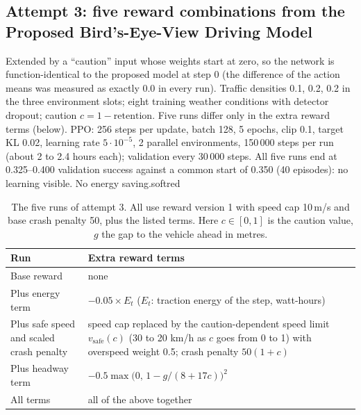 \subsection{Attempt 3: five reward combinations from the Proposed Bird's-Eye-View Driving Model}
{Extended by a ``caution'' input whose weights start at zero, so the network is function-identical to the proposed model at step 0 (the difference of the action means was measured as exactly 0.0 in every run).}
{Traffic densities 0.1, 0.2, 0.2 in the three environment slots; eight training weather conditions with detector dropout; caution $c=1-\text{retention}$. Five runs differ only in the extra reward terms (below).}
{PPO: 256 steps per update, batch 128, 5 epochs, clip 0.1, target KL 0.02, learning rate $5\cdot10^{-5}$, 2 parallel environments, 150\,000 steps per run (about 2 to 2.4 hours each); validation every 30\,000 steps.}
{All five runs end at 0.325--0.400 validation success against a common start of 0.350 (40 episodes): no learning visible. No energy saving.}{softred}

\begin{table}[H]\centering\small
\caption{The five runs of attempt 3. All use reward version 1 with speed cap 10\,m/s and base crash penalty 50, plus the listed terms. Here $c\in[0,1]$ is the caution value, $g$ the gap to the vehicle ahead in metres.}\label{tab:rl3}
\begin{tabularx}{\textwidth}{@{}>{\raggedright\arraybackslash}p{3.4cm}X@{}}\toprule
Run & Extra reward terms\\\midrule
Base reward & none\\
Plus energy term & $-0.05\times E_t$ ($E_t$: traction energy of the step, watt-hours)\\
Plus safe speed and scaled crash penalty & speed cap replaced by the caution-dependent speed limit $v_{\mathrm{safe}}(c)$ (30 to 20 km/h as $c$ goes from 0 to 1) with overspeed weight 0.5; crash penalty $50(1+c)$\\
Plus headway term & $-0.5\max\!\big(0,\,1-g/(8+17c)\big)^2$\\
All terms & all of the above together\\\bottomrule
\end{tabularx}
\end{table}
\resizebox{\textwidth}{!}{}

